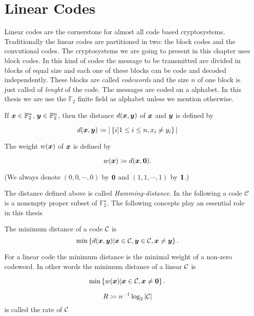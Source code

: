 \section{Linear Codes}

Linear codes are the cornerstone for almost all code based cryptosystems. Traditionally the linear codes are partitioned in two: the block codes and the convutional codes. The cryptosystems we are going to present in this chapter uses block codes. In this kind of codes the message to be transmitted are divided in blocks of equal size and each one of these blocks can be code and decoded independently. These blocks are called \textit{codewords} and the size $n$ of one block is just called of \textit{lenght} of the code. The messages are coded on a alphabet. In this thesis we are use the $\mathbb{F}_2$ finite field as alphabet unless we mention otherwise.

{
     If $\boldsymbol{x}\in \mathbb{F}_2^n$, $\boldsymbol{y}\in \mathbb{F}_2^n$, then the distance $d(\boldsymbol{x},\boldsymbol{y})$ of $\boldsymbol{x}$ and $\boldsymbol{y}$ is defined by
    
    \[
        d(\boldsymbol{x},\boldsymbol{y}) \coloneqq |\left\{i|1\leq i \leq n, x_i \neq y_i\right\}|
        \]
    
    The weight $w(\boldsymbol{x})$ of $\boldsymbol{x}$ is defined by 
    
    \[
        w(\boldsymbol{x})\coloneqq d(\boldsymbol{x},\boldsymbol{0}).
    \]
}

(We always denote $(0,0,\cdots,0)$ by $\boldsymbol{0}$ and $(1,1,\cdots,1)$ by  $\boldsymbol{1}$.)

The distance defined above is called \textit{Hamming-distance}. 
In the following a code $\mathcal{C}$ is a nonempty proper subset of $\mathbb{F}_2^n$. The following concepts play an essential role in this thesis

{
     The minimum distance of a code $\mathcal{C}$ is 
    \[
        \min\left\{d(\boldsymbol{x}, \boldsymbol{y})|\boldsymbol{x}\in \mathcal{C}, \boldsymbol{y} \in \mathcal{C}, \boldsymbol{x}\neq \boldsymbol{y}\right\}.
    \]
    
    For a linear code the minimum distance is the minimal weight of a non-zero codeword. In other words the minimum distance of a linear $\mathcal{C}$ is
    
    \[
        \min\left\{ w(\boldsymbol{x}) |  \boldsymbol{x} \in \mathcal{C}, \boldsymbol{x}\neq \boldsymbol{0}\right\}.
    \]
}
{
    \[
        R\coloneqq n^{-1}\log_2|\mathcal{C}|
    \]
    is called the rate of $\mathcal{C}$
}

